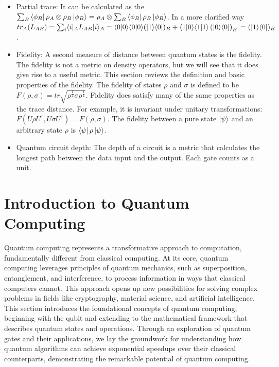 \documentclass{article}
\begin{document}
\begin{itemize}
			\item Partial trace: It can be calculated as the $\sum_B \bra{\phi_B} \rho_A \otimes \rho_B \ket{\phi_B} = \rho_A \otimes \sum_B \bra{\phi_B} \rho_B \ket{\phi_B}$. In a more clarified way $tr_A(L_{AB}) =\sum_i \langle i|_A L_{AB} |i\rangle_A=\langle0|0\rangle\langle 0|0\rangle (|1\rangle\langle0|)_B+\langle1|0\rangle\langle 1|1\rangle \left(|0\rangle\langle0|\right)_B\\ =(|1\rangle\langle0|)_B$ . 

			\item Fidelity: A second measure of distance between quantum states is the ﬁdelity. The ﬁdelity is not a metric on density operators, but we will see that it does give rise to a useful metric. This  section reviews the deﬁnition and basic properties of the ﬁdelity. The ﬁdelity of states $\rho$ and $\sigma$ is deﬁned to be $F(\rho,\sigma) = tr \sqrt{\rho^{\frac{1}{2}} \sigma \rho^{\frac{1}{2}}}$. Fidelity does satisfy many of the same properties as the trace distance. For example, it is invariant under unitary transformations: $F(U\rho U^{\dag}, U\sigma U^{\dag}) = F(\rho,\sigma)$. The ﬁdelity between a pure state $\ket{\psi}$ and an arbitrary state $\rho$ is $\bra{\psi}\rho\ket{\psi}$.\cite{quantccompquantinfo}

			\item Quantum circuit depth: The depth of a circuit is a metric that calculates the longest path between the data input and the output. Each gate counts as a unit.


		\end{itemize}

\newpage

\section{Introduction to Quantum Computing}

	Quantum computing represents a transformative approach to computation, fundamentally different from classical computing. At its core, quantum computing leverages principles of quantum mechanics, such as superposition, entanglement, and interference, to process information in ways that classical computers cannot. This approach opens up new possibilities for solving complex problems in fields like cryptography, material science, and artificial intelligence. This section introduces the foundational concepts of quantum computing, beginning with the qubit and extending to the mathematical framework that describes quantum states and operations. Through an exploration of quantum gates and their applications, we lay the groundwork for understanding how quantum algorithms can achieve exponential speedups over their classical counterparts, demonstrating the remarkable potential of quantum computing.
\end{document}
